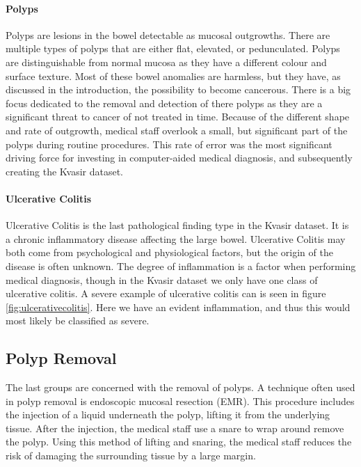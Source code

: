 \paragraph{Polyps}
Polyps are lesions in the bowel detectable as mucosal outgrowths. There are multiple types of polyps that are either flat, elevated, or pedunculated. Polyps are distinguishable from normal mucosa as they have a different colour and surface texture. Most of these bowel anomalies are harmless, but they have, as discussed in the introduction, the possibility to become cancerous. 
There is a big focus dedicated to the removal and detection of there polyps as they are a significant threat to cancer of not treated in time. Because of the different shape and rate of outgrowth, medical staff overlook a small, but significant part of the polyps during routine procedures. 
This rate of error was the most significant driving force for investing in computer-aided medical diagnosis, and subsequently creating the Kvasir dataset.

\paragraph{Ulcerative Colitis}
Ulcerative Colitis is the last pathological finding type in the Kvasir dataset. 
It is a chronic inflammatory disease affecting the large bowel. Ulcerative Colitis may both come from psychological and physiological factors, but the origin of the disease is often unknown. The degree of inflammation is a factor when performing medical diagnosis, though in the Kvasir dataset we only have one class of ulcerative colitis.
A severe example of ulcerative colitis can is seen in figure \ref{fig:ulcerativecolitis}. Here we have an evident inflammation, and thus this would most likely be classified as severe.



\subsection{Polyp Removal}
The last groups are concerned with the removal of polyps. A technique often used in polyp removal is endoscopic mucosal resection (EMR). 
This procedure includes the injection of a liquid underneath the polyp, lifting it from the underlying tissue. After the injection, the medical staff use a snare to wrap around remove the polyp. Using this method of lifting and snaring, the medical staff reduces the risk of damaging the surrounding tissue by a large margin.

